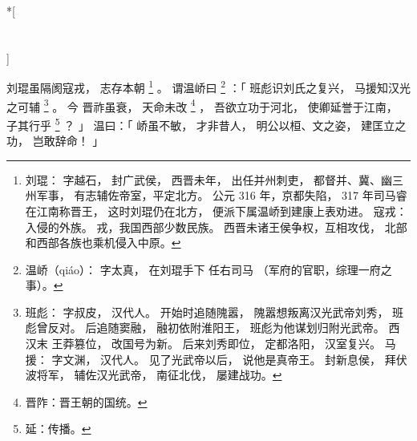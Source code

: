 
\switchcolumn[0]*[\section{}]

刘琨虽隔阂寇戎，
志存本朝%
\footnote{%
    刘琨：
        字越石，
        封广武侯，
        西晋未年，
        出任并州刺吏，
        都督并、冀、幽三州军事，
        有志辅佐帝室，平定北方。
        公元 316 年，京都失陷，
        317 年司马睿在江南称晋王，
        这时刘琨仍在北方，
        便派下属温峤到建康上表劝进。
    寇戎：
        入侵的外族。
        戎，我国西部少数民族。
        西晋未诸王侯争权，互相攻伐，
        北部和西部各族也乘机侵入中原。
}%
。
谓温峤曰%
\footnote{%
    温峤（qiáo）：
        字太真，
        在刘琨手下
        任右司马
        （军府的官职，综理一府之事）。
}%
：「
    班彪识刘氏之复兴，
    马援知汉光之可辅%
    \footnote{%
        班彪：
            字叔皮，
            汉代人。
            开始时追随隗嚣，
            隗嚣想叛离汉光武帝刘秀，
            班彪曾反对。
            后追随窦融，
            融初依附淮阳王，
            班彪为他谋划归附光武帝。
            西汉末
            王莽篡位，
            改国号为新。
            后来刘秀即位，
            定都洛阳，
            汉室复兴。
        马援：
            字文渊，
            汉代人。
            见了光武帝以后，
            说他是真帝王。
            封新息侯，
            拜伏波将军，
            辅佐汉光武帝，
            南征北伐，
            屡建战功。
    }%
    。
    今
    晋祚虽衰，
    天命未改%
    \footnote{%
        晋阼：晋王朝的国统。
    }%
    ，
    吾欲立功于河北，
    使卿延誉于江南，
    子其行乎%
    \footnote{%
        延：传播。
    }%
    ？
」
温曰：「
    峤虽不敏，
    才非昔人，
    明公以桓、文之姿，
    建匡立之功，
    岂敢辞命！
」

\switchcolumn



